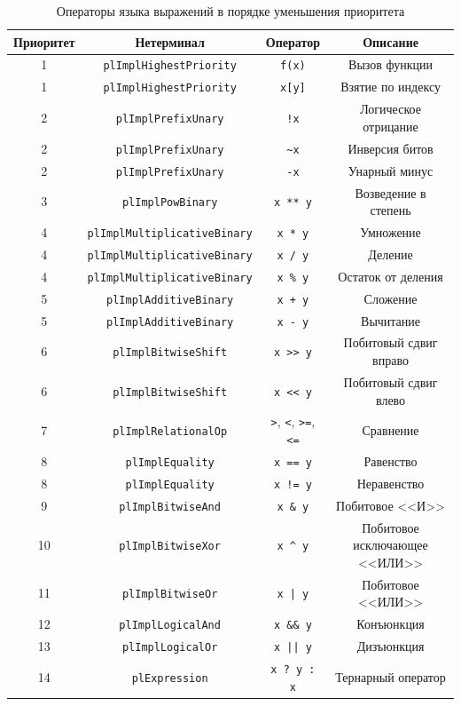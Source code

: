 \documentclass[times,specification,annotation]{style/itmo-student-thesis/itmo-student-thesis}
\begin{document}
\begin{table}[!h]
\caption{Операторы языка выражений в порядке уменьшения приоритета}\label{pl-operators-priority}
\centering
\begin{adjustbox}{angle=90}
\begin{tabular}{|*{4}{c|}}\hline
Приоритет & Нетерминал & Оператор & Описание\\\hline
1  & \texttt{plImplHighestPriority} & \texttt{f(x)} & Вызов функции \\\hline
1  & \texttt{plImplHighestPriority} & \texttt{x[y]} & Взятие по индексу \\\hline
2  & \texttt{plImplPrefixUnary} & \texttt{!x} & Логическое отрицание \\\hline
2  & \texttt{plImplPrefixUnary} & \texttt{\textasciitilde{x}} & Инверсия битов \\\hline
2  & \texttt{plImplPrefixUnary} & \texttt{-x} & Унарный минус \\\hline
3  & \texttt{plImplPowBinary} & \texttt{x ** y} & Возведение в степень \\\hline
4  & \texttt{plImplMultiplicativeBinary} & \texttt{x * y} & Умножение \\\hline
4  & \texttt{plImplMultiplicativeBinary} & \texttt{x / y} & Деление \\\hline
4  & \texttt{plImplMultiplicativeBinary} & \texttt{x \% y} & Остаток от деления \\\hline
5  & \texttt{plImplAdditiveBinary} & \texttt{x + y} & Сложение \\\hline
5  & \texttt{plImplAdditiveBinary} & \texttt{x - y} & Вычитание \\\hline
6  & \texttt{plImplBitwiseShift} & \texttt{x >{>} y} & Побитовый сдвиг вправо \\\hline
6  & \texttt{plImplBitwiseShift} & \texttt{x <{<} y} & Побитовый сдвиг влево \\\hline
7  & \texttt{plImplRelationalOp} & \texttt{>}, \texttt{<}, \texttt{>=}, \texttt{<=} & Сравнение \\\hline
8  & \texttt{plImplEquality} & \texttt{x == y} & Равенство \\\hline
8  & \texttt{plImplEquality} & \texttt{x != y} & Неравенство \\\hline
9  & \texttt{plImplBitwiseAnd} & \texttt{x \& y} & Побитовое <<И>> \\\hline
10  & \texttt{plImplBitwiseXor}  & \texttt{x \textasciicircum~y} & Побитовое исключающее <<ИЛИ>> \\\hline
11  & \texttt{plImplBitwiseOr}  & \texttt{x | y} & Побитовое <<ИЛИ>> \\\hline
12  & \texttt{plImplLogicalAnd}  & \texttt{x \&\& y} & Конъюнкция \\\hline
13  & \texttt{plImplLogicalOr}  & \texttt{x || y} & Дизъюнкция \\\hline
14  & \texttt{plExpression}  & \texttt{x ? y : x} & Тернарный оператор \\\hline
\end{tabular}
\end{adjustbox}
\end{table}
\end{document}
